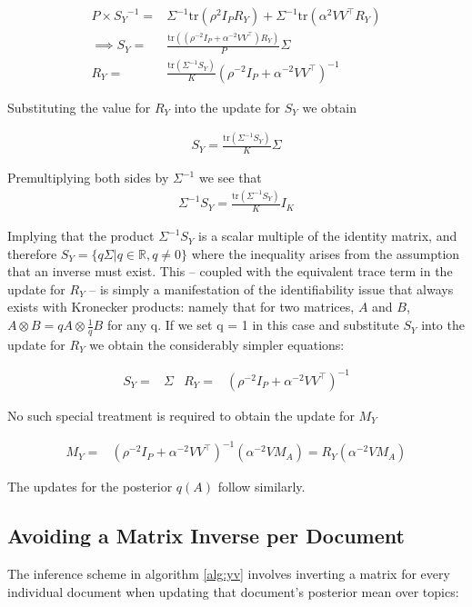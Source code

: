 \documentclass[10pt,fleqn]{article}
\newcommand \tr { \text{tr} }
\newcommand \T { ^\top }
\newcommand \Tr[1]   { \tr \left(  {#1}  \right) }
\newcommand \Real[0]  { { \mathbb{R} } }
\newcommand \inv[1] { {#1}^{-1} }
\newcommand \invb[1] { \inv{\left( #1 \right)} }
\newcommand \oneover[1] {
    \frac{1}{ {#1} }
}
\begin{document}
\begin{appendices}
\begin{align}
P \times \inv{S_Y} = & \inv{\Sigma}\Tr{\rho^2 I_P R_Y} + \inv{\Sigma}\Tr{\alpha^2 V V\T R_Y} \\
\implies S_Y = & \frac{\Tr{\left(\rho^{-2} I_P + \alpha^{-2} V V\T\right) R_Y}}{P} \Sigma \\ 
R_Y = & \frac{\Tr{\inv{\Sigma}S_Y}}{K} \invb{\rho^{-2} I_P + \alpha^{-2} V V\T}\end{align}

Substituting the value for $R_Y$ into the update for $S_Y$ we obtain

\begin{align}
S_Y = \frac{\Tr{\inv{\Sigma}S_Y}}{K} \Sigma
\end{align}

Premultiplying both sides by $\inv{\Sigma}$ we see that
\begin{align}
\inv{\Sigma} S_Y = \frac{\Tr{\inv{\Sigma}S_Y}}{K} I_K
\end{align}

Implying that the product $\inv{\Sigma} S_Y$ is a scalar multiple of the identity matrix, and therefore $S_Y = \{ q \Sigma | q \in \Real, q \neq 0 \}$ where the inequality arises from the assumption that an inverse must exist. This -- coupled with the equivalent trace term in the update for $R_Y$ -- is simply a manifestation of the identifiability issue that always exists with Kronecker products: namely that for two matrices, $A$ and $B$, $A \otimes B = q A \otimes \oneover{q}B$ for any q. If we set q = 1 in this case and substitute $S_Y$ into the update for $R_Y$ we obtain the considerably simpler equations:

\begin{align}
S_Y = & \Sigma &
R_Y = & \invb{\rho^{-2} I_P + \alpha^{-2}V V\T}
\end{align}

No such special treatment is required to obtain the update for $M_Y$

\begin{align}
M_Y = & \invb{\rho^{-2} I_P + \alpha^{-2} V V\T}(\alpha^{-2}V M_A) = R_Y (\alpha^{-2} V M_A)
\end{align}

The updates for the posterior $q(A)$ follow similarly.

\subsection{Avoiding a Matrix Inverse per Document}
The inference scheme in algorithm \ref{alg:yv} involves inverting a matrix for every individual document when updating that document's posterior mean over topics:


\end{appendices}
\end{document}
